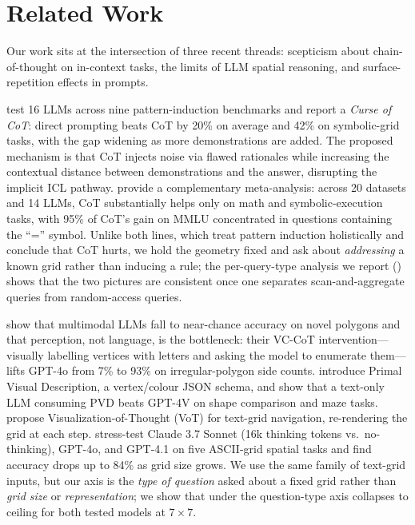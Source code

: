 \section{Related Work}
\label{sec:related}

Our work sits at the intersection of three recent threads: scepticism
about chain-of-thought on in-context tasks, the limits of LLM spatial
reasoning, and surface-repetition effects in prompts.

\citet{zheng2025curse} test 16 LLMs across nine pattern-induction
benchmarks and report a \emph{Curse of CoT}: direct prompting beats CoT
by 20\% on average and 42\% on symbolic-grid tasks, with the gap
widening as more demonstrations are added. The proposed mechanism is
that CoT injects noise via flawed rationales while increasing the
contextual distance between demonstrations and the answer, disrupting
the implicit ICL pathway. \citet{sprague2025tocot} provide a
complementary meta-analysis: across 20 datasets and 14 LLMs, CoT
substantially helps only on math and symbolic-execution tasks, with
95\% of CoT's gain on MMLU concentrated in questions containing the
``='' symbol. Unlike both lines, which treat pattern induction
holistically and conclude that CoT hurts, we hold the
geometry fixed and ask about \emph{addressing} a known grid rather than
inducing a rule; the per-query-type analysis we report ()
shows that the two pictures are consistent once one separates
scan-and-aggregate queries from random-access queries.

\citet{rudman2025polygons} show that multimodal LLMs fall to
near-chance accuracy on novel polygons and that perception, not
language, is the bottleneck: their VC-CoT intervention---visually
labelling vertices with letters and asking the model to enumerate
them---lifts GPT-4o from 7\% to 93\% on irregular-polygon side counts.
\citet{wang2025vdlm} introduce Primal Visual Description, a vertex/colour
JSON schema, and show that a text-only LLM consuming PVD beats GPT-4V on
shape comparison and maze tasks. \citet{wu2024vot} propose
Visualization-of-Thought (VoT) for text-grid navigation, re-rendering
the grid at each step. \citet{bai2025matrix} stress-test Claude 3.7
Sonnet (16k thinking tokens vs.\ no-thinking), GPT-4o, and GPT-4.1 on
five ASCII-grid spatial tasks and find accuracy drops up to 84\% as grid
size grows. We use the same family of text-grid inputs, but our axis
is the \emph{type of question} asked about a fixed grid rather than
\emph{grid size} or \emph{representation}; we show that under \COT the
question-type axis collapses to ceiling for both tested models at
$7{\times}7$.

